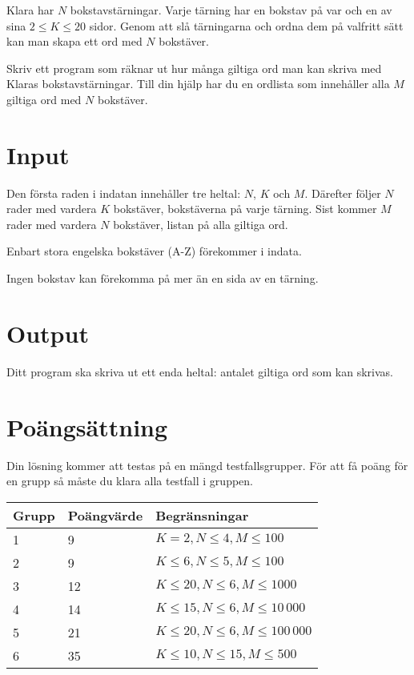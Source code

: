 
Klara har $N$ bokstavstärningar.
Varje tärning har en bokstav på var och en av sina $2 \le K \le 20$ sidor.
Genom att slå tärningarna och ordna dem på valfritt sätt kan man skapa ett ord med $N$ bokstäver.

Skriv ett program som räknar ut hur många giltiga ord man kan skriva med Klaras bokstavstärningar.
Till din hjälp har du en ordlista som innehåller alla $M$ giltiga ord med $N$ bokstäver.

\section*{Input}

Den första raden i indatan innehåller tre heltal: $N$, $K$ och $M$.
Därefter följer $N$ rader med vardera $K$ bokstäver, bokstäverna på varje tärning.
Sist kommer $M$ rader med vardera $N$ bokstäver, listan på alla giltiga ord.

Enbart stora engelska bokstäver (A-Z) förekommer i indata.

Ingen bokstav kan förekomma på mer än en sida av en tärning.

\section*{Output}

Ditt program ska skriva ut ett enda heltal: antalet giltiga ord som kan skrivas.

\section*{Poängsättning}
Din lösning kommer att testas på en mängd testfallsgrupper. För att få poäng för en grupp så måste du klara alla testfall i gruppen.

\begin{tabular}{| l | l | l |}
	\hline
	Grupp & Poängvärde & Begränsningar\\ \hline
	1     & 9          & $K = 2, N \le 4, M \le 100$ \\ \hline
	2     & 9          & $K \le 6, N \le 5, M \le 100$ \\ \hline
	3     & 12         & $K \le 20, N \le 6, M \le 1000$ \\ \hline
	4     & 14         & $K \le 15, N \le 6, M \le 10\,000$ \\ \hline
	5     & 21         & $K \le 20, N \le 6, M \le 100\,000$ \\ \hline
	6     & 35         & $K \le 10, N \le 15, M \le 500$ \\ \hline
\end{tabular}
